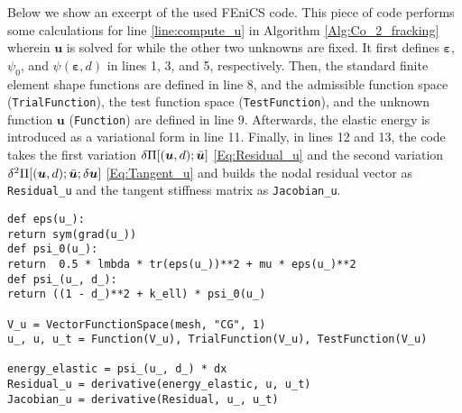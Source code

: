 Below we show an excerpt of the used FEniCS code. This piece of code performs some calculations for line \ref{line:compute_u} in Algorithm \ref{Alg:Co_2_fracking} wherein $\bm{u}$ is solved for while the other two unknowns are fixed. It first defines $\bm{\varepsilon}$, $\psi_0$, and $\psi(\bm{\varepsilon},d)$ in lines 1, 3, and 5, respectively. Then, the standard finite element shape functions are defined in line 8, and the admissible function space (\texttt{TrialFunction}), the test function space (\texttt{TestFunction}), and the unknown function $\bm{u}$ (\texttt{Function}) are defined in line 9. Afterwards, the elastic energy is introduced as a variational form in line 11. Finally, in lines 12 and 13, the code takes the first variation $\delta\Pi[(\bm{u},d);\Bar{\bm{u}}]$ \eqref{Eq:Residual_u} and the second variation $\delta^2\Pi[(\bm{u},d);\Bar{\bm{u}};\delta\bm{u}]$ \eqref{Eq:Tangent_u} and builds the nodal residual vector as \texttt{Residual\_u} and the tangent stiffness matrix as \texttt{Jacobian\_u}.
\begin{lstlisting}
def eps(u_):
return sym(grad(u_))
def psi_0(u_):
return  0.5 * lmbda * tr(eps(u_))**2 + mu * eps(u_)**2
def psi_(u_, d_):
return ((1 - d_)**2 + k_ell) * psi_0(u_)

V_u = VectorFunctionSpace(mesh, "CG", 1)
u_, u, u_t = Function(V_u), TrialFunction(V_u), TestFunction(V_u)

energy_elastic = psi_(u_, d_) * dx
Residual_u = derivative(energy_elastic, u, u_t)
Jacobian_u = derivative(Residual, u_, u_t)
\end{lstlisting}



